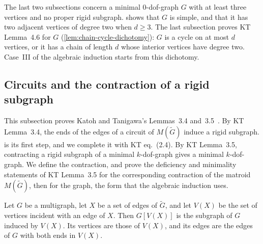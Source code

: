 The last two subsections concern a minimal $0$-dof-graph $G$ with at
least three vertices and no proper rigid subgraph.
 shows that $G$ is simple, and
that it has two adjacent vertices of degree two when $d \ge 3$. The last
subsection proves KT Lemma~4.6 for $G$
(\cref{lem:chain-cycle-dichotomy}): $G$ is a cycle on at most $d$
vertices, or it has a chain of length $d$ whose interior vertices have
degree two. Case~III of the algebraic induction starts from this
dichotomy.

\subsection{Circuits and the contraction of a rigid subgraph}
\label{sec:molecular-induction-inherited}

This subsection proves Katoh and Tanigawa's Lemmas~3.4
and~3.5~\cite[\S3.2]{katohTanigawa2011}. By KT Lemma~3.4, the ends of
the edges of a circuit of $M(\tilde G)$ induce a rigid subgraph.
 is its first step, and we complete it with KT
eq.~(2.4). By KT Lemma~3.5, contracting a rigid subgraph of a minimal
$k$-dof-graph gives a minimal $k$-dof-graph. We define the contraction,
and prove the deficiency and minimality statements of KT Lemma~3.5 for
the corresponding contraction of the matroid $M(\tilde G)$, then for the
graph, the form that the algebraic induction uses.

\begin{definition}
  \label{def:induced-span}
  \leanok
  Let $G$ be a multigraph, let $X$ be a set of edges of $\tilde G$, and
  let $V(X)$ be the set of vertices incident with an edge of $X$. Then
  $G[V(X)]$ is the subgraph of $G$ induced by $V(X)$. Its vertices are
  those of $V(X)$, and its edges are the edges of $G$ with both ends in
  $V(X)$.
\end{definition}

